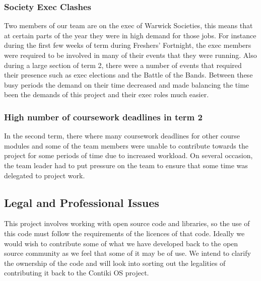 \subsubsection{Society Exec Clashes}
Two members of our team are on the exec of Warwick Societies, this means that at certain parts of the year they were in high demand for those jobs. For instance during the first few weeks of term during Freshers' Fortnight, the exec members were required to be involved in many of their events that they were running. Also during a large section of term 2, there were a number of events that required their presence such as exec elections and the Battle of the Bands. Between these busy periods the demand on their time decreased and made balancing the time been the demands of this project and their exec roles much easier.

\subsubsection{High number of coursework deadlines in term 2}
In the second term, there where many coursework deadlines for other course modules and some of the team members were unable to contribute towards the project for some periods of time due to increased workload. On several occasion, the team leader had to put pressure on the team to ensure that some time was delegated to project work. 

\subsection{Legal and Professional Issues}

This project involves working with open source code and libraries, so the use of this code must follow the requirements of the licences of that code. Ideally we would wish to contribute some of what we have developed back to the open source community as we feel that some of it may be of use. We intend to clarify the ownership of the code and will look into sorting out the legalities of contributing it back to the Contiki OS project.


